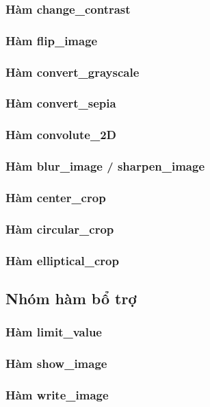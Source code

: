 \documentclass{article}
\begin{document}
\subsubsection{Hàm change\_contrast}


\subsubsection{Hàm flip\_image}
\subsubsection{Hàm convert\_grayscale}
\subsubsection{Hàm convert\_sepia}
\subsubsection{Hàm convolute\_2D}
\subsubsection{Hàm blur\_image / sharpen\_image}
\subsubsection{Hàm center\_crop}
\subsubsection{Hàm circular\_crop}
\subsubsection{Hàm elliptical\_crop}

\subsection{Nhóm hàm bổ trợ}
\subsubsection{Hàm limit\_value}
\subsubsection{Hàm show\_image}
\subsubsection{Hàm write\_image}
\end{document}

